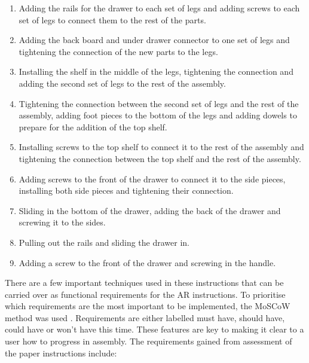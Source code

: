 \documentclass{l4proj}
\begin{document}
\begin{enumerate}
    \item Adding the rails for the drawer to each set of legs and adding screws to each set of legs to connect them to the rest of the parts.
    \item Adding the back board and under drawer connector to one set of legs and tightening the connection of the new parts to the legs.
    \item Installing the shelf in the middle of the legs, tightening the connection and adding the second set of legs to the rest of the assembly.
    \item Tightening the connection between the second set of legs and the rest of the assembly, adding foot pieces to the bottom of the legs and adding dowels to prepare for the addition of the top shelf.
    \item Installing screws to the top shelf to connect it to the rest of the assembly and tightening the connection between the top shelf and the rest of the assembly.
    \item Adding screws to the front of the drawer to connect it to the side pieces, installing both side pieces and tightening their connection.
    \item  Sliding in the bottom of the drawer, adding the back of the drawer and screwing it to the sides.
    \item Pulling out the rails and sliding the drawer in.
    \item Adding a screw to the front of the drawer and screwing in the handle.
\end{enumerate}

There are a few important techniques used in these instructions that can be carried over as functional requirements for the AR instructions. To prioritise which requirements are the most important to be implemented, the MoSCoW method was used \citep{business_chapter_2024}. Requirements are either labelled must have, should have, could have or won't have this time. These features are key to making it clear to a user how to progress in assembly. The requirements gained from assessment of the paper instructions include:
\end{document}
